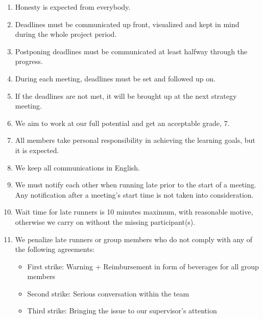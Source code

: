 \begin{enumerate}
	\item Honesty is expected from everybody.
	\item Deadlines must be communicated up front, visualized and kept in mind during the whole project period.
	\item Postponing deadlines must be communicated at least halfway through the progress.
	\item During each meeting, deadlines must be set and followed up on.
	\item If the deadlines are not met, it will be brought up at the next strategy meeting.
	\item We aim to work at our full potential and get an acceptable grade, 7.
	\item All members take personal responsibility in achieving the learning goals, but it is expected.
	\item We keep all communications in English.
	\item We must notify each other when running late prior to the start of a meeting. Any notification after a meeting's start time is not taken into consideration.
	\item Wait time for late runners is 10 minutes maximum, with reasonable motive, otherwise we carry on without the missing participant(s).
	\item We penalize late runners or group members who do not comply with any of the following agreements:
	\begin{itemize}
		\item First strike: Warning + Reimbursement in form of beverages for all group members
		\item Second strike: Serious conversation within the team
		\item Third strike: Bringing the issue to our supervisor's attention
	\end{itemize}
	

\end{enumerate}
